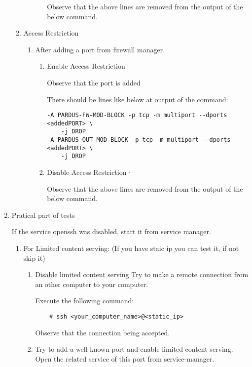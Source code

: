 \documentclass[a4paper,10pt]{article}
\begin{document}
\begin{enumerate}
\begin{enumerate}
\begin{enumerate}
\begin{enumerate}
    	Observe that the above lines are removed from the output of the below command.
        \end{enumerate}
    \end{enumerate}

\item Access Restriction 
\begin{enumerate}
    \item After adding a port from firewall manager.
        \begin{enumerate}
        \item Enable Access Restriction

            Observe that the port is added

            There should be lines like below at output of the command:

\begin{verbatim}
-A PARDUS-FW-MOD-BLOCK -p tcp -m multiport --dports <addedPORT> \
    -j DROP
-A PARDUS-OUT-MOD-BLOCK -p tcp -m multiport --dports <addedPORT> \
    -j DROP
\end{verbatim} 

        \item Disable Access Restriction·

              Observe that the above lines are removed from the output of the below command.
        \end{enumerate}
    \end{enumerate}
\end{enumerate}
\item Pratical part of tests

    If the service openssh was disabled, start it from service manager.
\begin{enumerate}
    \item For Limited content serving: (If you have staic ip you can test it, if not skip it)
    \begin{enumerate}
        \item Disable limited content serving
              Try to make a remote connection from an other computer to your computer.

              Execute the following command:
\begin{verbatim}
    # ssh <your_computer_name>@<static_ip>
\end{verbatim} 
              Observe that the connection being accepted.

        \item Try to add a well known port and enable limited content serving.
            Open the related service of this port from service-manager.


\end{enumerate}
\end{enumerate}
\end{enumerate}
\end{document}
